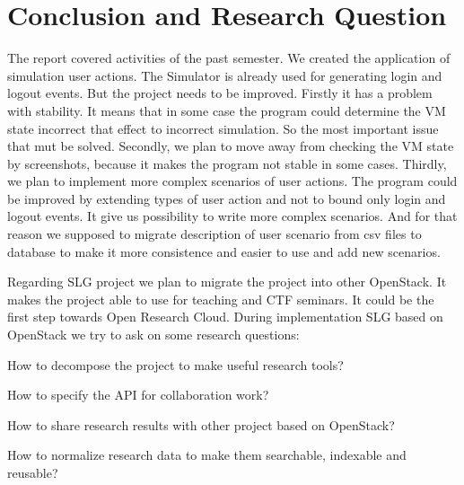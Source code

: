 \section{Conclusion and Research Question}

The report covered activities of the past semester. We created the application of simulation user actions. The Simulator is already used for generating login and logout events. But the project needs to be improved. Firstly it has a problem with stability. It means that in some case the program could determine the VM state incorrect that effect to incorrect simulation. So the most important issue that mut be solved. Secondly, we plan to move away from checking the VM state by screenshots, because it makes the program not stable in some cases. Thirdly, we plan to implement more complex scenarios of user actions. The program could be improved by extending types of user action and not to bound only login and logout events. It give us possibility to write more complex scenarios. And for that reason we supposed to migrate description of user scenario from csv files to database to make it more consistence and easier to use and add new scenarios.    

Regarding SLG project we plan to migrate the project into other OpenStack. It makes the project able to use for teaching and CTF seminars. It could be the first step towards Open Research Cloud. During implementation SLG based on OpenStack we try to ask on some research questions: 
\begin{compactitem}
\item How to decompose the project to make useful research tools?
\item How to specify the API for collaboration work?
\item How to share research results with other project based on OpenStack?
\item How to normalize research data to make them searchable, indexable and reusable?  
\end{compactitem}